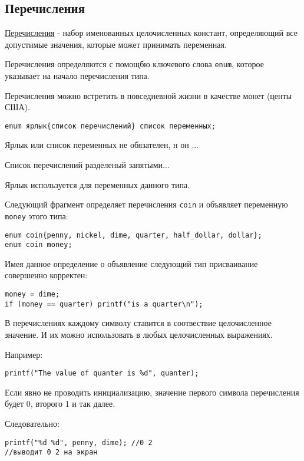 \subsection{Перечисления}

\underline{Перечисления} - набор именованных целочисленных констант, определяющий все допустимые значения, которые может принимать переменная.

Перечисления определяются с помощбю ключевого слова \texttt{enum}, которое указывает на начало перечисления типа.

Перечисления можно встретить в повседневной жизни в качестве монет (центы США).

\begin{verbatim}
enum ярлык{список перечислений} список переменных;
\end{verbatim}

Ярлык или список переменных не обязателен, н он ...

Список перечислений разделеный запятыми...

Ярлык используется для переменных данного типа.

Следующий фрагмент определяет перечисления \texttt{coin} и объявляет переменную \texttt{money} этого типа:

\begin{verbatim}
enum coin{penny, nickel, dime, quarter, half_dollar, dollar};
enum coin money;
\end{verbatim}

Имея данное определение о объявление следующий тип присваивание совершенно корректен:

\begin{verbatim}
money = dime;
if (money == quarter) printf("is a quarter\n");
\end{verbatim}

В перечислениях каждому символу ставится в соотвествие целочисленное значение. И их можно использовать в любых целочисленных выражениях.

Например:

\begin{verbatim}
printf("The value of quanter is %d", quanter);
\end{verbatim}

Если явно не проводить инициализацию, значение первого символа перечисления будет 0, второго 1 и так далее.

Следовательно:

\begin{verbatim}
printf("%d %d", penny, dime); //0 2
//выводит 0 2 на экран
\end{verbatim}

